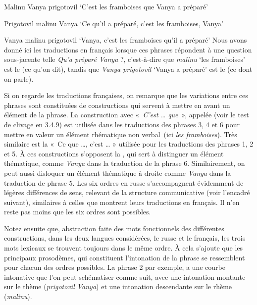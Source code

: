 {    \ex Malinu Vanya prigotovil
    \glt   ‘C’est les framboises que Vanya a préparé’

    \ex Prigotovil malinu Vanya
    \glt ‘Ce qu’il a préparé, c’est les framboises, Vanya’

    \ex Vanya malinu prigotovil
    \glt  ‘Vanya, c’est les framboises qu’il a préparé’
\z
\z
    Nous avons donné ici les traductions en français lorsque ces phrases répondent à une question sous-jacente telle \textit{Qu’a préparé Vanya} ?, c’est-à-dire que \textit{malinu} ‘les framboises’ est le  (ce qu’on dit), tandis que \textit{Vanya prigotovil} ‘Vanya a préparé’ est le  (ce dont on parle).

    Si on regarde les traductions françaises, on remarque que les variations entre ces phrases sont constituées de constructions qui servent à mettre en avant un élément de la phrase. La construction avec «~\textit{C’est … que}~», appelée  (voir le test de clivage en 3.4.9) est utilisée dans les traductions des phrases 3, 4 et 6 pour mettre en valeur un élément rhématique non verbal~(ici \textit{les framboises}). Très similaire est la  «~Ce que …, c’est … » utilisée pour les traductions des phrases 1, 2 et 5. À ces constructions s’opposent la , qui sert à distinguer un élément thématique, comme \textit{Vanya} dans la traduction de la phrase 6. Similairement, on peut aussi disloquer un élément thématique à droite comme \textit{Vanya} dans la traduction de phrase 5. Les six ordres en russe s’accompagnent évidemment de légères différences de sens, relevant de la structure communicative (voir l’encadré suivant), similaires à celles que montrent leurs traductions en français. Il n’en reste pas moins que les six ordres sont possibles.

    Notez ensuite que, abstraction faite des mots fonctionnels des différentes constructions, dans les deux langues considérées, le russe et le français, les trois mots lexicaux se trouvent toujours dans le même ordre. À cela s’ajoute que les principaux prosodèmes, qui constituent l’intonation de la phrase se ressemblent pour chacun des ordres possibles. La phrase 2 par exemple, a une courbe intonative que l’on peut schématiser comme suit, avec une intonation montante sur le thème (\textit{prigotovil Vanya}) et une intonation descendante sur le rhème (\textit{malinu}).

    \ea

}
